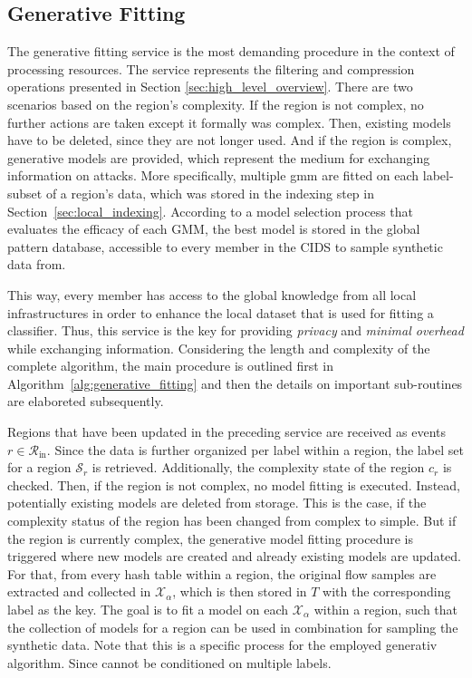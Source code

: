 \documentclass[../../main.tex]{subfiles}
\begin{document}
\subsection{Generative Fitting} \label{sec:generative_fitting}

The generative fitting service is the most demanding procedure in the context of processing resources. The service represents the filtering and compression operations presented in Section \ref{sec:high_level_overview}. There are two scenarios based on the region's complexity. If the region is not complex, no further actions are taken except it formally was complex. Then, existing models have to be deleted, since they are not longer used. And if the region is complex, generative models are provided, which represent the medium for exchanging information on attacks. More specifically, multiple \gls{gmm} are fitted on each label-subset of a region's data, which was stored in the indexing step in Section~\ref{sec:local_indexing}. According to a model selection process that evaluates the efficacy of each GMM, the best model is stored in the global pattern database, accessible to every member in the CIDS to sample synthetic data from. 

This way, every member has access to the global knowledge from all local infrastructures in order to enhance the local dataset that is used for fitting a classifier. Thus, this service is the key for providing \textit{privacy} and \textit{minimal overhead} while exchanging information. Considering the length and complexity of the complete algorithm, the main procedure is outlined first in Algorithm~\ref{alg:generative_fitting} and then the details on important sub-routines are elaboreted subsequently. 

Regions that have been updated in the preceding service are received as events $r \in \mathcal{R}_\text{in}$. Since the data is further organized per label within a region, the label set for a region $\mathcal{S}_r$ is retrieved. Additionally, the complexity state of the region $c_r$ is checked. Then, if the region is not complex, no model fitting is executed. Instead, potentially existing models are deleted from storage. This is the case, if the complexity status of the region has been changed from complex to simple. But if the region is currently complex, the generative model fitting procedure is triggered where new models are created and already existing models are updated. For that, from every hash table within a region, the original flow samples are extracted and collected in $\mathcal{X}_\alpha$, which is then stored in $T$ with the corresponding label as the key. The goal is to fit a model on each $\mathcal{X}_\alpha$ within a region, such that the collection of models for a region can be used in combination for sampling the synthetic data. Note that this is a specific process for the employed generativ algorithm. Since  cannot be conditioned on multiple labels.
\end{document}
